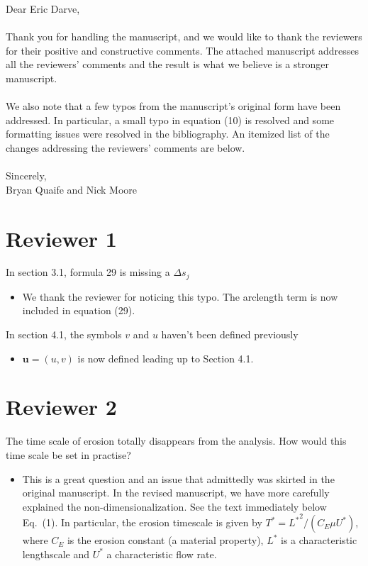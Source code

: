 \documentclass[11pt]{article}
\newcommand{\comment}[1]{{\color{blue} #1}}
\begin{document}
\noindent
Dear Eric Darve,
\\ \\
\noindent
Thank you for handling the manuscript, and we would like to thank the
reviewers for their positive and constructive comments.  The attached
manuscript addresses all the reviewers' comments and the result is what
we believe is a stronger manuscript.  
\\ \\
\noindent
We also note that a few typos from the manuscript's original form have
been addressed.  In particular, a small typo in equation (10) is
resolved and some formatting issues were resolved in the bibliography.
An itemized list of the changes addressing the reviewers' comments are
below.
\\ \\
\noindent
Sincerely,
\\
\noindent
Bryan Quaife and Nick Moore

\section*{Reviewer 1}

\noindent
\comment{In section 3.1, formula 29 is missing a $\Delta s_{j}$}
\begin{itemize}
  \item We thank the reviewer for noticing this typo.  The arclength
    term is now included in equation (29).
\end{itemize}

\noindent
\comment{In section 4.1, the symbols $v$ and $u$ haven't been defined
previously}
\begin{itemize}
  \item $\mathbf{u} = (u,v)$ is now defined leading up to Section 4.1.
\end{itemize}



\section*{Reviewer 2}
\noindent
\comment{The time scale of erosion totally disappears from the analysis.
How would this time scale be set in practise?}
\begin{itemize}
\item This is a great question and an issue that admittedly was skirted in the original manuscript. In the revised manuscript, we have more carefully explained the non-dimensionalization. See the text immediately below Eq.~(1). In particular, the erosion timescale is given by $T^* = {L^*}^2/(C_E \mu U^*)$, where $C_E$ is the erosion constant (a material property), $L^*$ is a characteristic lengthscale and $U^*$ a characteristic flow rate.
\end{itemize}
\end{document}
